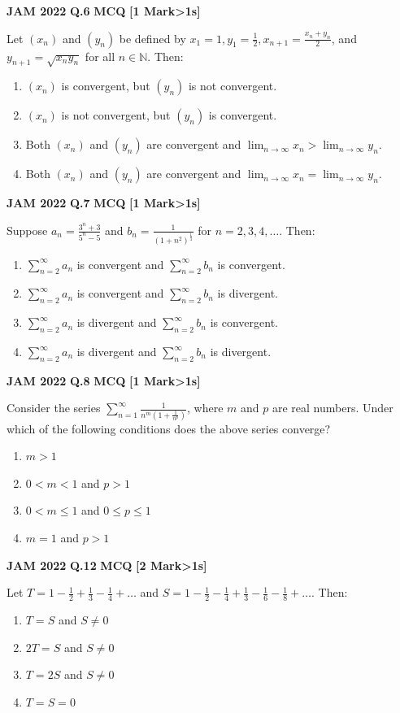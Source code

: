 \documentclass[11pt,a4paper]{article}
\newcommand{\pyqheader}[4]{%
    \noindent\begin{tcolorbox}[
        colback=badgebg,
        colframe=secondary,
        arc=2mm,
        boxrule=0.6pt,
        top=1.5mm,bottom=1.5mm,left=2mm,right=2mm
    ]
        \textbf{\textcolor{primary}{JAM #1}} \hfill \textbf{Q.#2} \hfill \textsc{\textbf{#3}} \hfill \textbf{[#4 Mark\ifnum#4>1s\fi]}
    \end{tcolorbox}\vspace{-1mm}
}
\begin{document}
\pyqheader{2022}{6}{MCQ}{1}
Let $(x_{n})$ and $(y_{n})$ be defined by $x_{1}=1, y_{1}=\frac{1}{2}, x_{n+1}=\frac{x_{n}+y_{n}}{2}$, and $y_{n+1}=\sqrt{x_{n}y_{n}}$ for all $n\in\mathbb{N}$. Then:
\begin{enumerate}[label=(\Alph*)]
    \item $(x_{n})$ is convergent, but $(y_{n})$ is not convergent.
    \item $(x_{n})$ is not convergent, but $(y_{n})$ is convergent.
    \item Both $(x_{n})$ and $(y_{n})$ are convergent and $\lim_{n\rightarrow\infty}x_{n}>\lim_{n\rightarrow\infty}y_{n}$.
    \item Both $(x_{n})$ and $(y_{n})$ are convergent and $\lim_{n\rightarrow\infty}x_{n}=\lim_{n\rightarrow\infty}y_{n}$.
\end{enumerate}

\pyqheader{2022}{7}{MCQ}{1}
Suppose $a_{n}=\frac{3^{n}+3}{5^{n}-5}$ and $b_{n}=\frac{1}{(1+n^{2})^{\frac{1}{4}}}$ for $n=2,3,4,\dots$. Then:
\begin{enumerate}[label=(\Alph*)]
    \item $\sum_{n=2}^{\infty} a_{n}$ is convergent and $\sum_{n=2}^{\infty} b_{n}$ is convergent.
    \item $\sum_{n=2}^{\infty} a_{n}$ is convergent and $\sum_{n=2}^{\infty} b_{n}$ is divergent.
    \item $\sum_{n=2}^{\infty} a_{n}$ is divergent and $\sum_{n=2}^{\infty} b_{n}$ is convergent.
    \item $\sum_{n=2}^{\infty} a_{n}$ is divergent and $\sum_{n=2}^{\infty} b_{n}$ is divergent.
\end{enumerate}

\pyqheader{2022}{8}{MCQ}{1}
Consider the series $\sum_{n=1}^{\infty}\frac{1}{n^{m}(1+\frac{1}{n^{p}})}$, where $m$ and $p$ are real numbers. Under which of the following conditions does the above series converge?
\begin{enumerate}[label=(\Alph*)]
    \item $m>1$
    \item $0<m<1$ and $p>1$
    \item $0<m\le 1$ and $0\le p\le 1$
    \item $m=1$ and $p>1$
\end{enumerate}

\pyqheader{2022}{12}{MCQ}{2}
Let $T = 1-\frac{1}{2}+\frac{1}{3}-\frac{1}{4}+\dots$ and $S = 1-\frac{1}{2}-\frac{1}{4}+\frac{1}{3}-\frac{1}{6}-\frac{1}{8}+\dots$. Then:
\begin{enumerate}[label=(\Alph*)]
    \item $T=S$ and $S\ne 0$
    \item $2T=S$ and $S\ne 0$
    \item $T=2S$ and $S\ne 0$
    \item $T=S=0$
\end{enumerate}
\end{document}
